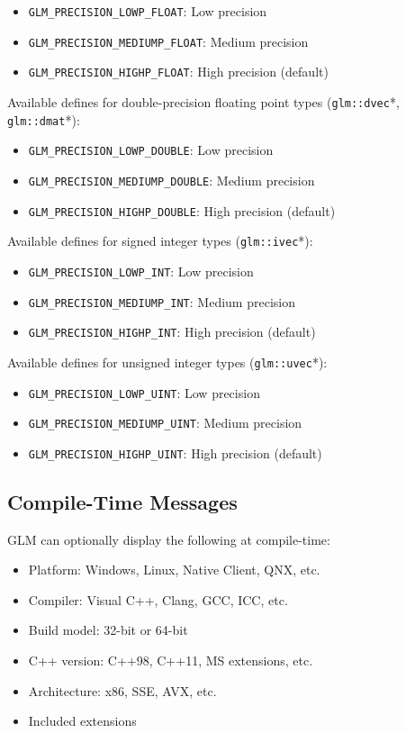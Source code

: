 \documentclass{scrartcl}
\numberwithin{figure}{subsection}
\begin{document}
\begin{itemize}
    \item \verb|GLM_PRECISION_LOWP_FLOAT|: Low precision
    \item \verb|GLM_PRECISION_MEDIUMP_FLOAT|: Medium precision 
    \item \verb|GLM_PRECISION_HIGHP_FLOAT|: High precision (default)
\end{itemize}

Available defines for double-precision floating point types (\verb|glm::dvec|*, \verb|glm::dmat|*):

\begin{itemize}
    \item \verb|GLM_PRECISION_LOWP_DOUBLE|: Low precision
    \item \verb|GLM_PRECISION_MEDIUMP_DOUBLE|: Medium precision 
    \item \verb|GLM_PRECISION_HIGHP_DOUBLE|: High precision (default)
\end{itemize}

Available defines for signed integer types (\verb|glm::ivec|*):

\begin{itemize}
    \item \verb|GLM_PRECISION_LOWP_INT|: Low precision
    \item \verb|GLM_PRECISION_MEDIUMP_INT|: Medium precision 
    \item \verb|GLM_PRECISION_HIGHP_INT|: High precision (default)
\end{itemize}

Available defines for unsigned integer types (\verb|glm::uvec|*):

\begin{itemize}
    \item \verb|GLM_PRECISION_LOWP_UINT|: Low precision
    \item \verb|GLM_PRECISION_MEDIUMP_UINT|: Medium precision 
    \item \verb|GLM_PRECISION_HIGHP_UINT|: High precision (default)
\end{itemize}

\subsection{Compile-Time Messages}

GLM can optionally display the following at compile-time:

\begin{itemize}
    \item Platform: Windows, Linux, Native Client, QNX, etc. 
    \item Compiler: Visual C++, Clang, GCC, ICC, etc.
    \item Build model: 32-bit or 64-bit
    \item C++ version: C++98, C++11, MS extensions, etc.
    \item Architecture: x86, SSE, AVX, etc.
    \item Included extensions
\end{itemize}
\end{document}
